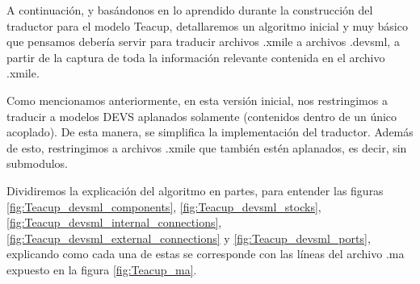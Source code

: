 A continuación, y basándonos en lo aprendido durante la construcción del traductor para el modelo Teacup, detallaremos un algoritmo inicial y muy básico que pensamos debería servir para traducir archivos .xmile a archivos .devsml, a partir de la captura de toda la información relevante contenida en el archivo .xmile.

Como mencionamos anteriormente, en esta versión inicial, nos restringimos a traducir a modelos DEVS aplanados solamente (contenidos dentro de un único acoplado). De esta manera, se simplifica la implementación del traductor. Además de esto, restringimos a archivos .xmile que también estén aplanados, es decir, sin submodulos.

Dividiremos la explicación del algoritmo en partes, para entender las figuras \ref{fig:Teacup_devsml_components}, \ref{fig:Teacup_devsml_stocks}, \ref{fig:Teacup_devsml_internal_connections}, \ref{fig:Teacup_devsml_external_connections} y \ref{fig:Teacup_devsml_ports}, explicando como cada una de estas se corresponde con las líneas del archivo .ma expuesto en la figura \ref{fig:Teacup_ma}.

